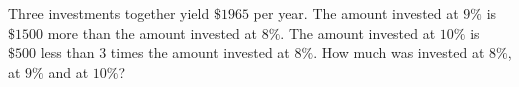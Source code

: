 Three investments together yield $\$1965$ per year. The amount invested at $9\%$ is $\$1500$ more than the amount invested at $8\%$. The amount invested at $10\%$ is $\$500$ less than $3$ times the amount invested at $8\%$. How much was invested at $8\%$, at $9\%$ and at $10\%$?

